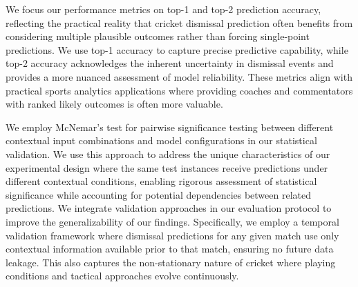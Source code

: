 \documentclass[sigconf,anonymous,review]{acmart}
\begin{document}
We focus our performance metrics on top-1 and top-2 prediction accuracy, reflecting the practical reality that cricket dismissal prediction often benefits from considering multiple plausible outcomes rather than forcing single-point predictions. We use top-1 accuracy to capture precise predictive capability, while top-2 accuracy acknowledges the inherent uncertainty in dismissal events and provides a more nuanced assessment of model reliability.
These metrics align with practical sports analytics applications where providing coaches and commentators with ranked likely outcomes is often more valuable.

We employ McNemar's test for pairwise significance testing between different contextual input combinations and model configurations in our statistical validation. We use this approach to address the unique characteristics of our experimental design where the same test instances receive predictions under different contextual conditions, enabling rigorous assessment of statistical significance while accounting for potential dependencies between related predictions.
We integrate validation approaches in our evaluation protocol to improve the generalizability of our findings. Specifically, we employ a temporal validation framework where dismissal predictions for any given match use only contextual information available prior to that match, ensuring no future data leakage. This also captures the non-stationary nature of cricket where playing conditions and tactical approaches evolve continuously.


\end{document}
